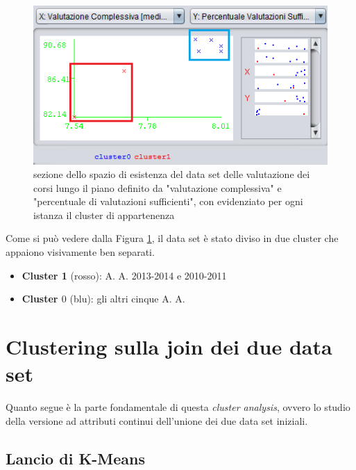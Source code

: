         

        \begin{figure}
            \centering
            \caption{sezione dello spazio di esistenza del data set delle valutazione dei corsi lungo il piano definito da "valutazione complessiva" e "percentuale di valutazioni sufficienti", con evidenziato per ogni istanza il cluster di appartenenza}
            \label{eval_kmeans}
            \includegraphics[scale=1.2]{../cluster/eval_kmeans.png}
        \end{figure}

        Come si può vedere dalla Figura \ref{eval_kmeans}, il data set è stato diviso in due cluster che appaiono visivamente ben separati.

        \begin{itemize}
            \item \textbf{Cluster 1} (rosso): A. A. 2013-2014 e 2010-2011
            \item \textbf{Cluster $0$} (blu): gli altri cinque A. A.
        \end{itemize}

\section{Clustering sulla join dei due data set}

    Quanto segue è la parte fondamentale di questa \textit{cluster analysis}, ovvero lo studio della versione ad attributi continui dell'unione dei due data set iniziali.

    \subsection{Lancio di K-Means}

